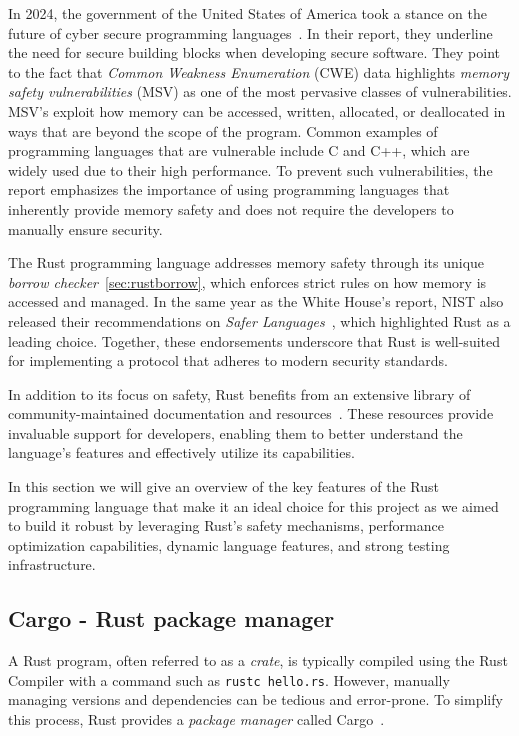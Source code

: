 \documentclass[11pt]{report}
\theoremstyle{definition}
\theoremstyle{plain}
\begin{document}
In 2024, the government of the United States of America took a stance on the future of cyber secure programming languages~\cite{whitehouse2024memorysafe}. In their report, they underline the need for secure building blocks when developing secure software. They point to the fact that \textit{Common Weakness Enumeration} (CWE) data highlights \textit{memory safety vulnerabilities} (MSV) as one of the most pervasive classes of vulnerabilities. MSV's exploit how memory can be accessed, written, allocated, or deallocated in ways that are beyond the scope of the program. Common examples of programming languages that are vulnerable include C and C++, which are widely used due to their high performance. To prevent such vulnerabilities, the report emphasizes the importance of using programming languages that inherently provide memory safety and does not require the developers to manually ensure security.

The Rust programming language addresses memory safety through its unique \textit{borrow checker}~\autoref{sec:rustborrow}, which enforces strict rules on how memory is accessed and managed. In the same year as the White House's report, NIST also released their recommendations on \textit{Safer Languages}~\cite{nistsaferlanguages}, which highlighted Rust as a leading choice. Together, these endorsements underscore that Rust is well-suited for implementing a protocol that adheres to modern security standards.

In addition to its focus on safety, Rust benefits from an extensive library of community-maintained documentation and resources~\cite{rustlangRustProgramming,rustlangPerformanceBook,lurklurkEffectiveRust}. These resources provide invaluable support for developers, enabling them to better understand the language's features and effectively utilize its capabilities.

In this section we will give an overview of the key features of the Rust programming language that make it an ideal choice for this project as we aimed to build it robust by leveraging Rust's safety mechanisms, performance optimization capabilities, dynamic language features, and strong testing infrastructure.

\subsection{Cargo - Rust package manager}\label{sec:cargo}
A Rust program, often referred to as a \textit{crate}, is typically compiled using the Rust Compiler with a command such as \texttt{rustc hello.rs}. However, manually managing versions and dependencies can be tedious and error-prone. To simplify this process, Rust provides a \textit{package manager} called Cargo~\cite{rustlangCargo}.
\end{document}
